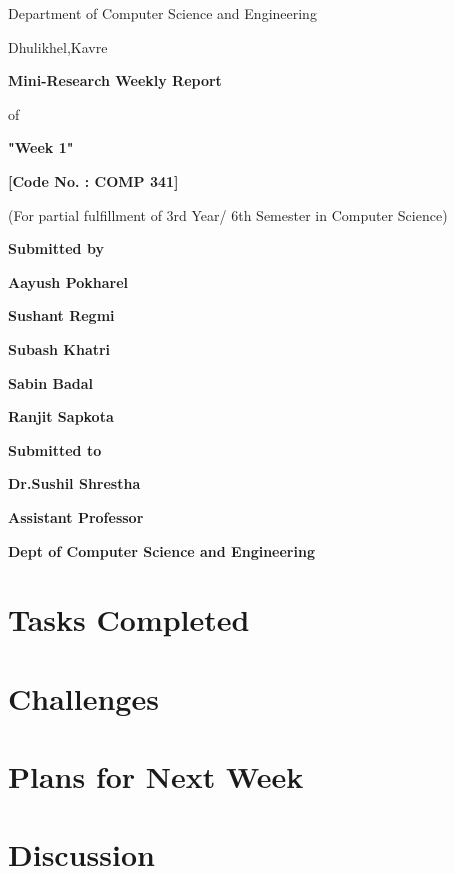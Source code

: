 \documentclass{article}
\begin{document}
{\LARGE{}}

\centerline{Department of Computer Science and Engineering}
\centerline{Dhulikhel,Kavre}

\vspace*{30mm}

\centerline{\textbf{Mini-Research Weekly Report}}
\centerline{of}
\centerline{{\textbf{"Week 1"}}}

\vspace*{10mm}

\centerline{\textbf{[Code No. : COMP 341]}}
\centerline{(For partial fulfillment of 3rd Year/ 6th Semester in Computer Science)}

\vspace*{30mm}

\centerline{\textbf{Submitted by}}

\centerline{\textbf{Aayush Pokharel}}
\centerline{\textbf{Sushant Regmi}}
\centerline{\textbf{Subash Khatri}}
\centerline{\textbf{Sabin Badal}}
\centerline{\textbf{Ranjit Sapkota}}


\vspace*{40mm}


\centerline{\textbf{Submitted to}}
\centerline{\textbf{Dr.Sushil Shrestha}}
\centerline{{\textbf{Assistant Professor}}}
\centerline{\textbf{Dept of Computer Science and Engineering}}


\thispagestyle{empty}
\clearpage
{}

\section{Tasks Completed}

\section{Challenges}

\section{Plans for Next Week}

\section{Discussion}
\end{document}
